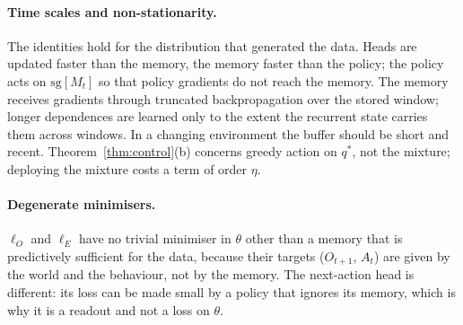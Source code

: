 \documentclass[11pt]{article}
\theoremstyle{plain}
\theoremstyle{definition}
\theoremstyle{remark}
\newcommand{\sg}{\mathrm{sg}}
\begin{document}
\paragraph{Time scales and non-stationarity.} The identities hold for the distribution that generated the data. Heads are updated faster than the memory, the memory faster than the policy; the policy acts on $\sg[M_t]$ so that policy gradients do not reach the memory. The memory receives gradients through truncated backpropagation over the stored window; longer dependences are learned only to the extent the recurrent state carries them across windows. In a changing environment the buffer should be short and recent. Theorem~\ref{thm:control}(b) concerns greedy action on $q^*$, not the mixture; deploying the mixture costs a term of order $\eta$.

\paragraph{Degenerate minimisers.} $\ell_O$ and $\ell_E$ have no trivial minimiser in $\theta$ other than a memory that is predictively sufficient for the data, because their targets ($O_{t+1}$, $A_t$) are given by the world and the behaviour, not by the memory. The next-action head is different: its loss can be made small by a policy that ignores its memory, which is why it is a readout and not a loss on $\theta$.
\end{document}
